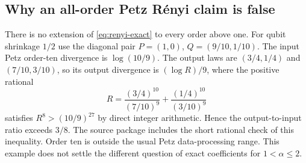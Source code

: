 \documentclass[11pt]{article}
\numberwithin{equation}{section}
\theoremstyle{definition}
\theoremstyle{remark}
\begin{document}
\subsection{Why an all-order Petz R\'enyi claim is false}
\label{app:order-ten}

There is no extension of \eqref{eq:renyi-exact} to every order above
one. For qubit shrinkage $1/2$ use the diagonal pair
$P=(1,0)$, $Q=(9/10,1/10)$.
The input Petz order-ten divergence is $\log(10/9)$.
The output laws are $(3/4,1/4)$ and $(7/10,3/10)$, so its
output divergence is $(\log R)/9$, where the positive rational
\[
 R=\frac{(3/4)^{10}}{(7/10)^9}
   +\frac{(1/4)^{10}}{(3/10)^9}
\]
satisfies $R^8>(10/9)^{27}$ by direct integer arithmetic.
Hence the output-to-input ratio exceeds $3/8$.
The source package includes the short rational check of this inequality.
Order ten is outside the usual Petz data-processing range. This example
does not settle the different question of exact coefficients for
$1<\alpha\leq2$.
\end{document}
